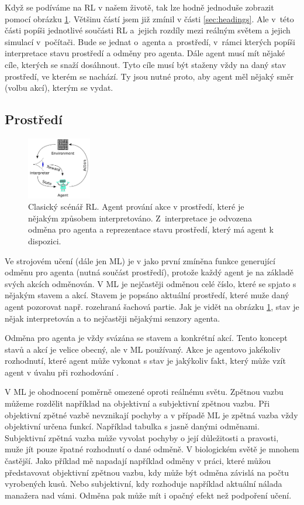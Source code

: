\documentclass{article}
\begin{document}
Když se podíváme na RL v našem životě, tak lze hodně jednoduše zobrazit pomocí obrázku \ref{zavislostKnnRec}. Většinu částí jsem již zmínil v části \ref{sec:headings}. Ale v~této části popíši jednotlivé součásti RL a~jejich rozdíly mezi reálným světem a jejich simulací v~počítači. Bude se jednat o~agenta a~prostředí, v~rámci kterých popíši interpretace stavu prostředí a odměny pro agenta.
Dále agent musí mít nějaké cíle, kterých se snaží dosáhnout. Tyto cíle musí být staženy vždy na daný stav prostředí, ve kterém se nachází. Ty jsou nutné proto, aby agent měl nějaký směr (volbu akcí), kterým se vydat. 

\subsection{Prostředí}

\begin{figure}\centering
	\includegraphics[width=0.25\textwidth]{img/RLdiagram}
 	\caption[]{Clasický scénář RL. Agent prování akce v prostředí, které je nějakým způsobem interpretováno. Z~interpretace je odvozena odměna pro agenta a reprezentace stavu prostředí, který má agent k dispozici. \cite{pict} }\label{zavislostKnnRec}
 \end{figure}	


Ve strojovém učení (dále jen ML) je v \cite{sutton1999reinforcement} jako první zmíněna funkce generující odměnu pro agenta (nutná součást prostředí), protože každý agent je na základě svých akcích odměnován. V ML je nejčastěji odměnou celé číslo, které se spjato s nějakým stavem a akcí. Stavem je popsáno aktuální prostředí, které muže daný agent pozorovat např. rozehraná šachová partie. Jak je vidět na obrázku \ref{zavislostKnnRec}, stav je nějak interpretován a to nejčastěji nějakými senzory agenta.
 

Odměna pro agenta je vždy svázána se stavem a konkrétní akcí. Tento koncept stavů a akcí je velice obecný, ale v ML používaný. Akce je agentovo jakékoliv rozhodnutí, které agent může vykonat s stav je jakýkoliv fakt, který může vzít agent v úvahu při rozhodování \cite{sutton1999reinforcement}. 

V ML je ohodnocení poměrně omezené oproti reálnému světu. Zpětnou vazbu můžeme rozdělit například na objektivní a subjektivní zpětnou vazbu. Při objektivní zpětné vazbě nevznikají pochyby a v případě ML je zpětná vazba vždy objektivní určena funkcí. Například tabulka s jasně danými odměnami. Subjektivní zpětná vazba může vyvolat pochyby o její důležitosti a pravosti, muže jít pouze špatné rozhodnutí o dané odměně. V biologickém světě je mnohem častější. Jako příklad mě napadají například odměny v práci, které můžou představovat objektivní zpětnou vazbu, kdy může být odměna závislá na počtu vyrobených kusů. Nebo subjektivní, kdy rozhoduje například aktuální nálada manažera nad vámi. Odměna pak může mít i opačný efekt než podpoření učení.
\end{document}
